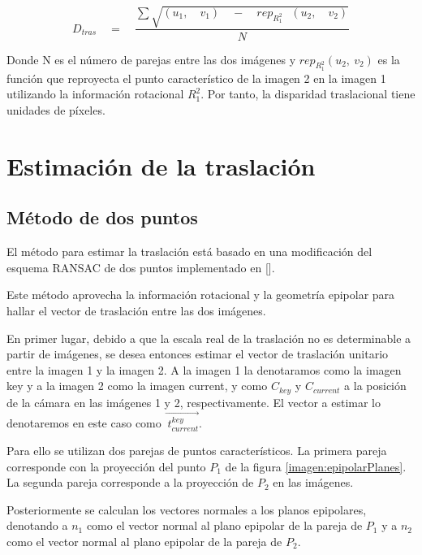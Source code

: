 \begin{equation}
{ D }_{ tras }\quad =\quad \frac { \sum { \sqrt { ({ u }_{ 1 },\quad { v }_{ 1 })\quad -\quad { rep }_{ { R }_{ 1 }^{ 2 }\quad  }({ u }_{ 2 },\quad { v }_{ 2 }) }  }  }{ N } 
\label{eq:DisparidadTraslacional}
\end{equation}

Donde N es el número de parejas entre las dos imágenes y ${ rep }_{ { R }_{ 1 }^{ 2 }}({ u }_{ 2 },\ { v }_{ 2 })$ es la función que reproyecta el punto característico de la imagen 2 en la imagen 1 utilizando la información rotacional ${ R }_{ 1 }^{ 2}$. 
Por tanto, la disparidad traslacional tiene unidades de píxeles.



\section{Estimación de la traslación}

\subsection{Método de dos puntos}
El método para estimar la traslación está basado en una modificación del esquema RANSAC de dos puntos implementado en [].
 
Este método aprovecha la información rotacional y la geometría epipolar para hallar el vector de traslación entre las dos imágenes.

En primer lugar, debido a que la escala real de la traslación no es determinable a partir de imágenes,  se desea entonces estimar el vector de traslación unitario entre la imagen 1 y la imagen 2. A la imagen 1 la denotaramos como la imagen key y a la imagen 2 como la imagen current, y como ${C}_{key}$ y ${C}_{current}$ a la posición de la cámara en las imágenes 1 y 2, respectivamente. El vector a estimar lo denotaremos en este caso como $\overset { \rightarrow  }{ { \ t }_{ current }^{ key } }  $.

Para ello se utilizan dos parejas de puntos característicos. La primera pareja corresponde con la proyección del punto ${P}_{1}$ de la figura \ref{imagen:epipolarPlanes}. La segunda pareja corresponde a la proyección de ${P}_{2}$ en las imágenes. 

Posteriormente se  calculan los vectores normales a los planos epipolares, denotando a ${n}_{1}$ como el vector normal al plano epipolar de la pareja de ${P}_{1}$ y a ${n}_{2}$ como el vector normal al plano epipolar de la pareja de ${P}_{2}$.


